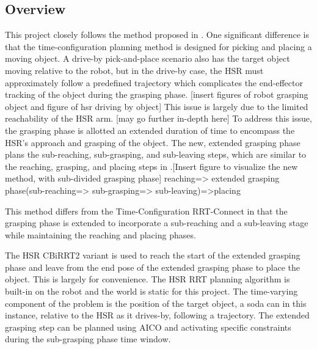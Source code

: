 \documentclass[12pt]{article}
\begin{document}
        \subsection{Overview}
            This project closely follows the method proposed in \cite{yang_planning_2018}. One significant difference is that the time-configuration planning method is designed for picking and placing a moving object. A drive-by pick-and-place scenario also has the target object moving relative to the robot, but in the drive-by case, the HSR must approximately follow a predefined trajectory which complicates the end-effector tracking of the object during the grasping phase. [insert figures of robot grasping object and figure of hsr driving by object] This issue is largely due to the limited reachability of the HSR arm. [may go further in-depth here] To address this issue, the grasping phase is allotted an extended duration of time to encompass the HSR's approach and grasping of the object. The new, extended grasping phase plans the sub-reaching, sub-grasping, and sub-leaving steps, which are similar to the reaching, grasping, and placing steps in \cite{yang_planning_2018}.[Insert figure to visualize the new method, with sub-divided grasping phase] reaching=> extended grasping phase(sub-reaching=> sub-grasping=> sub-leaving)=>placing

            \par This method differs from the Time-Configuration RRT-Connect in that the grasping phase is extended to incorporate a sub-reaching and a sub-leaving stage while maintaining the reaching and placing phases. 

            \par The HSR CBiRRT2 variant is used to reach the start of the extended grasping phase and leave from the end pose of the extended grasping phase to place the object. This is largely for convenience. The HSR RRT planning algorithm is built-in on the robot and the world is static for this project. The time-varying component of the problem is the position of the target object, a soda can in this instance, relative to the HSR as it drives-by, following a trajectory. 
            The extended grasping step can be planned using AICO and activating specific constraints during the sub-grasping phase time window.
        
\end{document}
